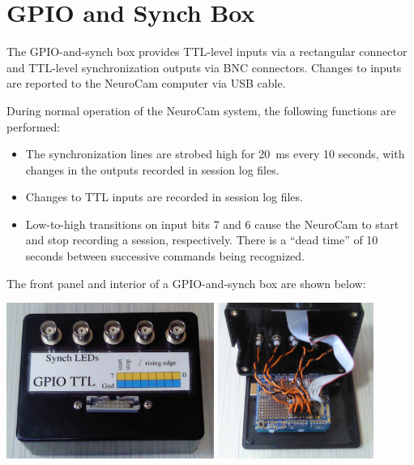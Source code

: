
\chapter{GPIO and Synch Box}
\label{gpio}

The GPIO-and-synch box provides TTL-level inputs via a rectangular connector
and TTL-level synchronization outputs via BNC connectors. Changes to inputs
are reported to the NeuroCam computer via USB cable.

During normal operation of the NeuroCam system, the following functions are
performed:
\begin{itemize}
\item The synchronization lines are strobed high for 20~ms every 10 seconds,
with changes in the outputs recorded in session log files.
\item Changes to TTL inputs are recorded in session log files.
\item Low-to-high transitions on input bits 7 and 6 cause the NeuroCam to
start and stop recording a session, respectively. There is a ``dead time''
of 10 seconds between successive commands being recognized.
\end{itemize}

The front panel and interior of a GPIO-and-synch box are shown below:

\begin{center}
\includegraphics[height=2in]{pics-gpio/gpio-closed.jpg}
\hspace{1in}
\includegraphics[height=2in]{pics-gpio/gpio-open.jpg}
\end{center}

